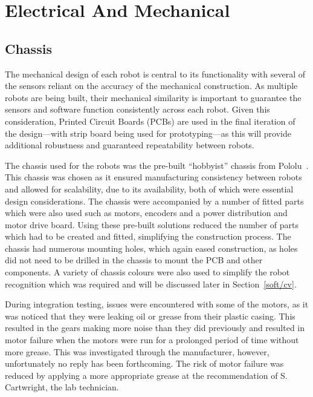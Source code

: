 
\chapter{Electrical And Mechanical}\label{electrical}

\section{Chassis}\label{mech/chassis}
The mechanical design of each robot is central to its 
functionality with several of the sensors
reliant on the accuracy of the mechanical construction. As 
multiple robots are being built, 
their mechanical similarity is important to guarantee the 
sensors and software function consistently across each robot. 
Given this consideration, Printed Circuit Boards (PCBs) are used in 
the final iteration of the design---with strip board being used for 
prototyping---as this will provide additional robustness and 
guaranteed repeatability between robots.

The chassis used for the robots was the pre-built ``hobbyist'' 
chassis from Pololu~\cite{pololuchassis}. This chassis was 
chosen as it ensured manufacturing consistency between robots and allowed 
for scalability, due to its availability, both of which were 
essential design considerations. The chassis were accompanied by 
a number of fitted parts which were also used such as motors, 
encoders and a power distribution and motor drive board. Using these pre-built 
solutions reduced the number of parts which had to be created 
and fitted, simplifying the construction process.
The chassis had numerous mounting holes, which again eased 
construction, as holes did not need to be drilled in the chassis 
to mount the PCB and other components. A variety of chassis 
colours were also used to simplify the robot recognition which 
was required and will be discussed later in Section~\ref{soft/cv}. 

During integration testing, issues were encountered with some of the motors, 
as it was noticed that they 
were leaking oil or grease from their plastic casing. This 
resulted in the gears making more noise than they did previously 
and resulted in motor failure when the motors were run for a 
prolonged period of time without more grease. This was 
investigated through the manufacturer, however, unfortunately no 
reply has been forthcoming. The risk of motor failure was 
reduced by applying a more appropriate grease at the 
recommendation of S. Cartwright, the lab technician.  

